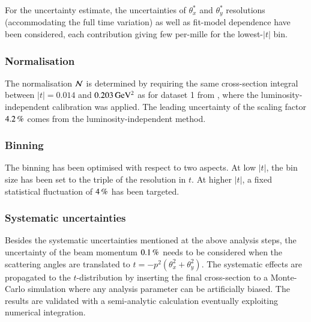 For the uncertainty estimate, the uncertainties of $\theta_x^*$ and $\theta_y^*$ resolutions (accommodating the full time variation) as well as fit-model dependence have been considered, each contribution giving few per-mille for the lowest-$|t|$ bin.

\subsubsection{Normalisation}

The normalisation ${\cal N}$ is determined by requiring the same cross-section integral between $|t| = 0.014$ and $0.203\,{\rm GeV^2}$ as for dataset 1 from \cite{prl111}, where the luminosity-independent calibration was applied. The leading uncertainty of the scaling factor $4.2\,{\rm \%}$ comes from the luminosity-independent method.



\subsubsection{Binning}

The binning has been optimised with respect to two aspects. At low $|t|$, the bin size has been set to the triple of the resolution in $t$. At higher $|t|$, a fixed statistical fluctuation of $4\,{\rm \%}$ has been targeted.


\subsubsection{Systematic uncertainties}

Besides the systematic uncertainties mentioned at the above analysis steps, the uncertainty of the beam momentum $0.1\,{\rm \%}$ needs to be considered when the scattering angles are translated to $t = - p^2 (\theta_x^2 + \theta_y^2)$. The systematic effects are propagated to the $t$-distribution by inserting the final cross-section to a Monte-Carlo simulation where any analysis parameter can be artificially biased. The results are validated with a semi-analytic calculation eventually exploiting numerical integration.

